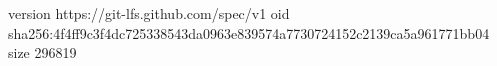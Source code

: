 version https://git-lfs.github.com/spec/v1
oid sha256:4f4ff9c3f4dc725338543da0963e839574a7730724152c2139ca5a961771bb04
size 296819
